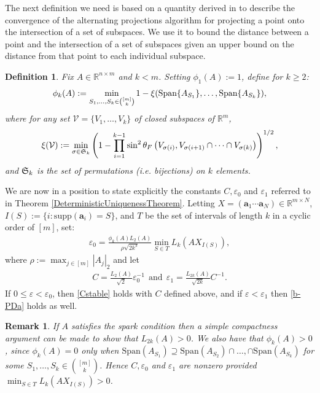 \documentclass[journal, onecolumn]{IEEEtran}
\newtheorem{definition}{Definition}
\newtheorem{remark}{Remark}
\begin{document}
The next definition we need is based on a quantity derived in \cite{Deutsch} to describe the convergence of the alternating projections algorithm for projecting a point onto the intersection of a set of subspaces. We use it to bound the distance between a point and the intersection of a set of subspaces given an upper bound on the distance from that point to each individual subspace.

\begin{definition}\label{SpecialSupportSet}
Fix $A \in \mathbb{R}^{n \times m}$ and $k < m$. Setting $\phi_1(A) := 1$, define for $k \geq 2$:
\begin{align}\label{rho}
\phi_k(A) := \min_{ S_1,\ldots,S_k \in {[m] \choose k} } 1 - \xi( \text{\rm Span}\{A_{S_1}\}, \ldots,  \text{\rm Span}\{A_{S_k}\}),
\end{align}
where for any set $\mathcal{V} = \{V_1, \ldots, V_k\}$ of closed subspaces of $\mathbb{R}^m$, 
\begin{align}
\xi(\mathcal{V}) := \min_{\sigma \in \frak{S}_k} \left(1 - \prod_{i=1}^{k-1} \sin^2  \theta_F \left(V_{\sigma(i)}, V_{\sigma(i+1)} \cap \cdots \cap V_{\sigma(k)}\right)  \right)^{1/2},
\end{align}
%
and $\frak{S}_{k}$ is the set of permutations (i.e. bijections) on $k$ elements. 
\end{definition}

We are now in a position to state explicitly the constants $C, \varepsilon_0$ and $\varepsilon_1$ referred to in Theorem \ref{DeterministicUniquenessTheorem}. Letting $X  = (\mathbf{a}_1 \cdots \mathbf{a}_N) \in \mathbb{R}^{m \times N}$, $I(S) := \{i : \text{supp}(\mathbf{a}_i) = S\}$, and $T$ be the set of intervals of length $k$ in a cyclic order of $[m]$, set:
\begin{align}\label{epsilon0}
\varepsilon_0 = \frac{ \phi_k(A) L_{2}(A) }{\rho \sqrt{2k^3}} \min_{S \in T} L_k(AX_{I(S)}), 
\end{align}
where $\rho := \max_{j \in [m]} |A_j|_2 $ and let
\begin{align}\label{Cdef}
C = \frac{L_{2}(A)}{ \sqrt{2}} \varepsilon_0^{-1} \ \ \text{and} \ \ \varepsilon_1 = \frac{L_{2k}(A)}{\sqrt{2k}} C^{-1}.
\end{align}
If $0 \leq \varepsilon < \varepsilon_0$, then \eqref{Cstable} holds with $C$ defined above, and if $\varepsilon < \varepsilon_1$ then \eqref{b-PDa} holds as well.

\begin{remark}\label{nonzero}
If $A$ satisfies the spark condition then a simple compactness argument can be made to show that $L_{2k}(A) > 0$. We also have that $\phi_k(A) > 0$, since $\phi_k(A) = 0$ only when $\text{Span}(A_{S_1}) \supseteq \text{Span}(A_{S_2}) \cap \ldots, \cap \text{Span}(A_{S_k})$ for some $S_1, \ldots, S_k \in {[m] \choose k}$. Hence $C, \varepsilon_0$ and $\varepsilon_1$ are nonzero provided $\min_{S \in T} L_k(AX_{I(S)}) > 0$. 
\end{remark}
\end{document}
